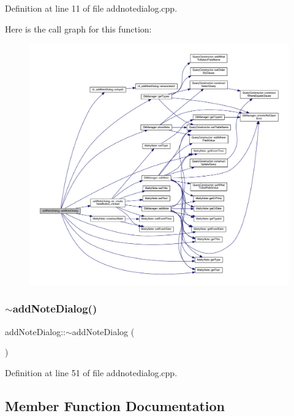 Definition at line 11 of file addnotedialog.\+cpp.

Here is the call graph for this function\+:
\nopagebreak
\begin{figure}[H]
\begin{center}
\leavevmode
\includegraphics[width=350pt]{classaddNoteDialog_a39bdf3974bd9d583959015b40205e3f5_cgraph}
\end{center}
\end{figure}
\hypertarget{classaddNoteDialog_a900c8ab72a54252fa03299d821af644f}{}\label{classaddNoteDialog_a900c8ab72a54252fa03299d821af644f} 
\subsubsection{\texorpdfstring{$\sim$add\+Note\+Dialog()}{~addNoteDialog()}}
{\footnotesize\ttfamily add\+Note\+Dialog\+::$\sim$add\+Note\+Dialog (\begin{DoxyParamCaption}{ }\end{DoxyParamCaption})}



Definition at line 51 of file addnotedialog.\+cpp.



\subsection{Member Function Documentation}
\hypertarget{classaddNoteDialog_a56670c6227c03bc1277f22789e7876e4}{}\label{classaddNoteDialog_a56670c6227c03bc1277f22789e7876e4} 
